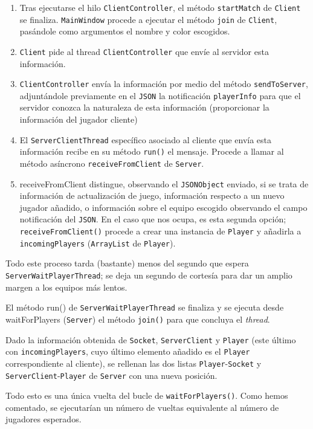\documentclass[../DocumentoOficial.tex]{subfiles}
\begin{document}
\begin{enumerate}
\item Tras ejecutarse el hilo \texttt{ClientController}, el método \texttt{startMatch} de \texttt{Client} se finaliza. \texttt{MainWindow} procede a ejecutar el método \texttt{join} de \texttt{Client}, pasándole como argumentos el nombre y color escogidos.
\item \texttt{Client} pide al thread \texttt{ClientController} que envíe al servidor esta información.
\item \texttt{ClientController} envía la información por medio del método \texttt{sendToServer}, adjuntándole previamente en el \texttt{JSON} la notificación \texttt{playerInfo} para que el servidor conozca la naturaleza de esta información (proporcionar la información del jugador cliente)
\item El \texttt{ServerClientThread} específico asociado al cliente que envía esta información recibe en su método \texttt{run()} el mensaje. Procede a llamar al método asíncrono \texttt{receiveFromClient} de \texttt{Server}.
\item receiveFromClient distingue, observando el \texttt{JSONObject} enviado, si se trata de información de actualización de juego, información respecto a un nuevo jugador añadido, o información sobre el equipo escogido observando el campo notificación del \texttt{JSON}. En el caso que nos ocupa, es esta segunda opción; \texttt{receiveFromClient()} procede a crear una instancia de \texttt{Player} y añadirla a \texttt{incomingPlayers} (\texttt{ArrayList} de \texttt{Player}).
\end{enumerate}

Todo este proceso tarda (bastante) menos del segundo que espera \texttt{ServerWaitPlayerThread}; se deja un segundo de cortesía para dar un amplio margen a los equipos más lentos.

El método run() de \texttt{ServerWaitPlayerThread} se finaliza y se ejecuta desde waitForPlayers (\texttt{Server}) el método \texttt{join()} para que concluya el \textit{thread}.

Dado la información obtenida de \texttt{Socket}, \texttt{ServerClient} y \texttt{Player} (este último con \texttt{incomingPlayers}, cuyo último elemento añadido es el \texttt{Player} correspondiente al cliente), se rellenan las dos listas \texttt{Player}-\texttt{Socket} y \texttt{ServerClient}-\texttt{Player} de \texttt{Server} con una nueva posición.

Todo esto es una única vuelta del bucle de \texttt{waitForPlayers()}. Como hemos comentado, se ejecutarían un número de vueltas equivalente al número de jugadores esperados.
\end{document}
